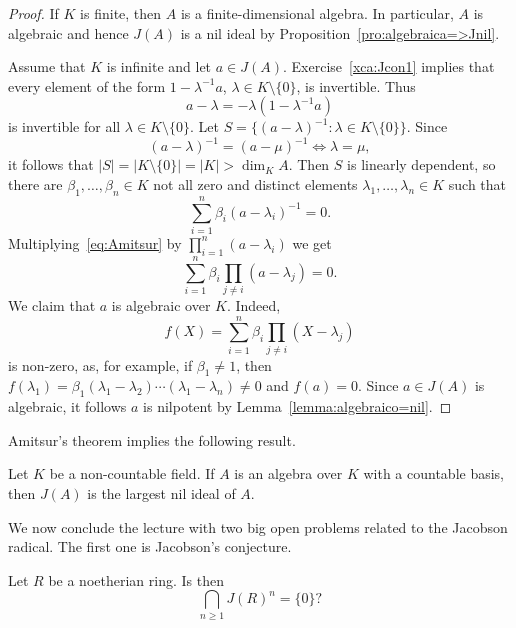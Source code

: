 \begin{proof}
	If $K$ is finite, then $A$ is a finite-dimensional algebra. In particular, $A$ is algebraic and
	hence $J(A)$ is a nil ideal by Proposition~\ref{pro:algebraica=>Jnil}.

	Assume that $K$ is infinite and let $a\in J(A)$. Exercise~\ref{xca:Jcon1} implies that 
	every element of the form 
	$1-\lambda^{-1}a$, $\lambda\in K\setminus\{0\}$, is invertible. Thus  
	\[
		a-\lambda=-\lambda(1-\lambda^{-1}a)
	\]
	is invertible for all $\lambda\in K\setminus\{0\}$. Let
	$S=\{(a-\lambda)^{-1}:\lambda\in K\setminus\{0\}\}$. Since 
	\[
	(a-\lambda)^{-1}=(a-\mu)^{-1}\Longleftrightarrow\lambda=\mu,
	\]
	it follows that $|S|=|K\setminus\{0\}|=|K|>\dim_KA$. Then $S$ 
	is linearly dependent, so there are $\beta_1,\dots,\beta_n\in K$
	not all zero and distinct elements $\lambda_1,\dots,\lambda_n\in K$ such that 
	\begin{equation}
		\label{eq:Amitsur}
		\sum_{i=1}^n \beta_i(a-\lambda_i)^{-1}=0.
	\end{equation}
	Multiplying~\eqref{eq:Amitsur} by $\prod_{i=1}^n(a-\lambda_i)$ we get 
	\[
		\sum_{i=1}^n\beta_i\prod_{j\ne i}(a-\lambda_j)=0.
	\]
	We claim that $a$ is algebraic over $K$. Indeed,  
	\[
		f(X)=\sum_{i=1}^n\beta_i\prod_{j\ne i}(X-\lambda_j)
	\]
	is non-zero, as, for example, if $\beta_1\ne1$, then  
	$f(\lambda_1)=\beta_1(\lambda_1-\lambda_2)\cdots(\lambda_1-\lambda_n)\ne0$
	and $f(a)=0$. Since $a\in J(A)$ is algebraic, it follows
	$a$ is nilpotent by Lemma~\ref{lemma:algebraico=nil}.
\end{proof}

Amitsur's theorem implies the following result. 

\begin{corollary}
Let $K$ be a non-countable field. If $A$ is an algebra
over $K$ with a countable basis, then 
$J(A)$ is the largest nil ideal of $A$.
\end{corollary}





We now conclude the lecture
with two big open problems related to the Jacobson radical. The first
one is Jacobson's conjecture. 

\begin{openproblem}[Jacobson]
\label{prob:Jacobson}
Let $R$ be a noetherian ring. Is then 
\[
\bigcap_{n\geq1}J(R)^n=\{0\}?
\]
\end{openproblem}

